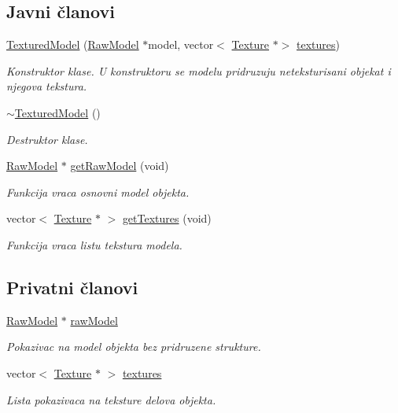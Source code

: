 \subsection*{Javni članovi}
\begin{DoxyCompactItemize}
\item 
\hyperlink{classmodel_1_1TexturedModel_aec5856afd9671aa31aa506f3452a616f}{Textured\+Model} (\hyperlink{classmodel_1_1RawModel}{Raw\+Model} $\ast$model, vector$<$ \hyperlink{classtexture_1_1Texture}{Texture} $\ast$$>$ \hyperlink{classmodel_1_1TexturedModel_a890c463573c2240f60f29471fb28b419}{textures})
\begin{DoxyCompactList}\small\item\em Konstruktor klase. U konstruktoru se modelu pridruzuju neteksturisani objekat i njegova tekstura. \end{DoxyCompactList}\item 
\hyperlink{classmodel_1_1TexturedModel_a8a11ba96d5a73a962a2ffcf8c5a53afe}{$\sim$\+Textured\+Model} ()
\begin{DoxyCompactList}\small\item\em Destruktor klase. \end{DoxyCompactList}\item 
\hyperlink{classmodel_1_1RawModel}{Raw\+Model} $\ast$ \hyperlink{classmodel_1_1TexturedModel_a9382bc8fb867a7f9ef8b120f0805b4b6}{get\+Raw\+Model} (void)
\begin{DoxyCompactList}\small\item\em Funkcija vraca osnovni model objekta. \end{DoxyCompactList}\item 
vector$<$ \hyperlink{classtexture_1_1Texture}{Texture} $\ast$ $>$ \hyperlink{classmodel_1_1TexturedModel_a09314a66eefacd609fc3bc414b8c5da7}{get\+Textures} (void)
\begin{DoxyCompactList}\small\item\em Funkcija vraca listu tekstura modela. \end{DoxyCompactList}\end{DoxyCompactItemize}
\subsection*{Privatni članovi}
\begin{DoxyCompactItemize}
\item 
\hyperlink{classmodel_1_1RawModel}{Raw\+Model} $\ast$ \hyperlink{classmodel_1_1TexturedModel_ac6157368c7e55a78aa02f9546f5f2dc3}{raw\+Model}
\begin{DoxyCompactList}\small\item\em Pokazivac na model objekta bez pridruzene strukture. \end{DoxyCompactList}\item 
vector$<$ \hyperlink{classtexture_1_1Texture}{Texture} $\ast$ $>$ \hyperlink{classmodel_1_1TexturedModel_a890c463573c2240f60f29471fb28b419}{textures}
\begin{DoxyCompactList}\small\item\em Lista pokazivaca na teksture delova objekta. \end{DoxyCompactList}\end{DoxyCompactItemize}


